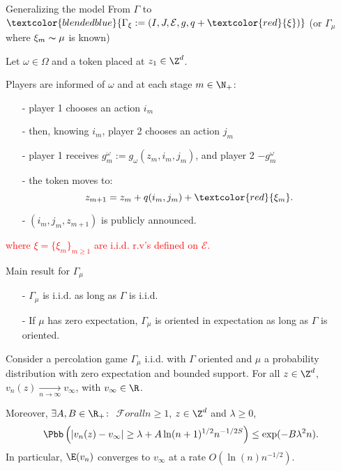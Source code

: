 \begin{frame}{Generalizing the model}
  From $\Gamma$ to $\textcolor{blendedblue}{\Gamma_{\xi} := (I, J, \mathcal{E}, g, q + \textcolor{red}{ \xi})}$ (or $\Gamma_{\mu}$ where $\xi_m \thicksim \mu$ is known)
  \vspace{0.5cm}

  Let $\omega \in \Omega$ and a token placed at $z_1 \in \Z^d$.
  \vspace{0.2cm}

  Players are informed of $\omega$ and at each stage $m \in \N_+$:
  \begin{itemize}
    \item[-] player 1 chooses an action $i_m$ 
    \item[-] then, knowing $i_m$, player 2 chooses an action $j_m$
    \item[-] player 1 receives $g_m^{\omega} := g_{\omega}(z_{m}, i_m, j_m)$, and player 2 $-g_m^{\omega}$
    \item[-] the token moves to:  
      \[
        z_{m+1} = z_m + q(i_m, j_m) + \textcolor{red}{\xi_m}.
      \]
    \item[-] $(i_m, j_m, z_{m+1})$ is publicly announced.
  \end{itemize}
  \vspace{0.2cm}

  \textcolor{red}{where $\xi = \{\xi_m\}_{m \geq 1}$ are i.i.d. r.v's defined on $\mathcal{E}$.} 
\end{frame}

\begin{frame}{Main result for $\Gamma_{\mu}$}
  \begin{itemize}
    \item[-] $\Gamma_{\mu}$ is i.i.d. as long as $\Gamma$ is i.i.d.
    \item[-] If $\mu$ has zero expectation, $\Gamma_{\mu}$ is oriented in expectation as long as $\Gamma$ is oriented.
  \end{itemize}

  \begin{theorem} \label{theorem-main}
    Consider a percolation game $\Gamma_{\mu}$ i.i.d. with $\Gamma$ oriented and $\mu$ a probability distribution with zero expectation and bounded support. For all $z \in \Z^d$, $v_n(z) \xrightarrow[n \to \infty]{} v_{\infty}$, with $v_{\infty} \in \R$. 

    Moreover, $\exists A, B \in \R_{+} \colon$ $\mathcal{F}orall n \geq 1$, $z \in \Z^d$ and $\lambda \geq 0$,
    \[
      \Pbb\left(|v_n(z) - v_{\infty}| \geq \lambda + A\ln(n + 1)^{1/2}n^{-1/2S} \right) \leq \exp(-B\lambda^2n).
    \]
    In particular, $\E(v_n)$ converges to $v_{\infty}$ at a rate $O(\ln(n)n^{-1/2})$.
  \end{theorem}
\end{frame}

